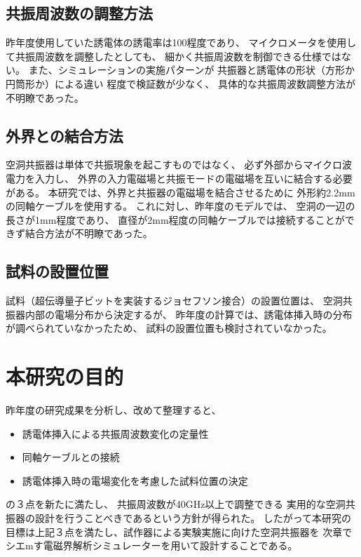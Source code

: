 \subsection*{共振周波数の調整方法}
昨年度使用していた誘電体の誘電率は100程度であり、
マイクロメータを使用して共振周波数を調整したとしても、
細かく共振周波数を制御できる仕様ではない。
また、シミュレーションの実施パターンが
共振器と誘電体の形状（方形か円筒形か）による違い
程度で検証数が少なく、
具体的な共振周波数調整方法が不明瞭であった。

\subsection*{外界との結合方法}
空洞共振器は単体で共振現象を起こすものではなく、
必ず外部からマイクロ波電力を入力し、
外界の入力電磁場と共振モードの電磁場を互いに結合する必要がある。
本研究では、外界と共振器の電磁場を結合させるために
外形約2.2mmの同軸ケーブルを使用する。
これに対し、昨年度のモデルでは、
空洞の一辺の長さが1mm程度であり、
直径が2mm程度の同軸ケーブルでは接続することができず結合方法が不明瞭であった。

\subsection*{試料の設置位置}
試料（超伝導量子ビットを実装するジョセフソン接合）の設置位置は、
空洞共振器内部の電場分布から決定するが、
昨年度の計算では、誘電体挿入時の分布が調べられていなかったため、
試料の設置位置も検討されていなかった。

\section{本研究の目的}
昨年度の研究成果を分析し、改めて整理すると、

\begin{itemize}
  \item 誘電体挿入による共振周波数変化の定量性
  \item 同軸ケーブルとの接続
  \item 誘電体挿入時の電場変化を考慮した試料位置の決定
\end{itemize}

の３点を新たに満たし、
共振周波数が40GHz以上で調整できる
実用的な空洞共振器の設計を行うことべきであるという方針が得られた。
したがって本研究の目標は上記３点を満たし、試作器による実験実施に向けた空洞共振器を
次章でシエmす電磁界解析シミュレーターを用いて設計することである。
